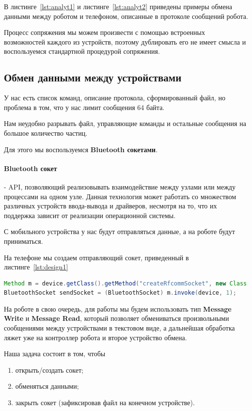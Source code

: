 В листинге~\ref{lst:analyt1} и листинге~\ref{lst:analyt2} приведены примеры обмена данными между роботом и телефоном, описанные в протоколе сообщений робота.

Процесс сопряжения мы можем произвести с помощью встроенных возможностей каждого из устройств, поэтому дублировать его не имеет смысла и воспользуемся стандартной процедурой сопряжения.

\subsection{Обмен данными между устройствами}

У нас есть список команд, описание протокола, сформированный файл, но проблема в том, что у нас лимит сообщения 64 байта.

Нам неудобно разрывать файл, управляющие команды и остальные сообщения на большое количество частиц.

Для этого мы воспользуемся \textbf{Bluetooth сокетами}.

\paragraph{Bluetooth сокет} -  API, позволяющий реализовывать взаимодействие между узлами или между процессами на одном узле. Данная технология может работать со множеством различных устройств ввода-вывода и драйверов, несмотря на то, что их поддержка зависит от реализации операционной системы.

С мобильного устройства у нас будут отправляться данные, а на роботе будут приниматься.

На телефоне мы создаем отправляющий сокет, приведенный в листинге~\ref{lst:design1} 

\begin{lstlisting}[caption={Создаем сокет с данными для отправки}, label=lst:design1, language=Java]
Method m = device.getClass().getMethod("createRfcommSocket", new Class[] { int.class }); 
BluetoothSocket sendSocket = (BluetoothSocket) m.invoke(device, 1);
\end{lstlisting}

На роботе в свою очередь, для работы мы будем использовать тип \textbf{Message Write} и \textbf{Message Read}, который позволяет обмениваться произвольными сообщениями между устройствами в текстовом виде, а дальнейшая обработка ляжет уже на контроллер робота и второе устройство обмена.

Наша задача состоит в том, чтобы 
\begin{enumerate}
  \item открыть/создать сокет;
  \item обменяться данными;
  \item закрыть сокет (зафиксировав файл на конечном устройстве).
\end{enumerate}

